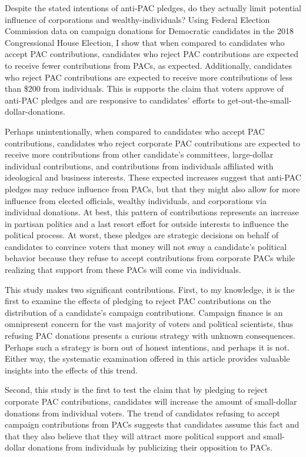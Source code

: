 \documentclass[12pt]{article}
\begin{document}
Despite the stated intentions of anti-PAC pledges, do they actually limit potential influence of corporations and wealthy-individuals? Using Federal Election Commission data on campaign donations for Democratic candidates in the 2018 Congressional House Election, I show that when compared to candidates who accept PAC contributions, candidates who reject PAC contributions are expected to receive fewer contributions from PACs, as expected. Additionally, candidates who reject PAC contributions are expected to receive more contributions of less than \$200 from individuals. This is supports the claim that voters approve of anti-PAC pledges and are responsive to candidates' efforts to get-out-the-small-dollar-donations.

Perhaps unintentionally, when compared to candidates who accept PAC contributions, candidates who reject corporate PAC contributions are expected to receive more contributions from other candidate's committees, large-dollar individual contributions, and contributions from individuals affiliated with ideological and business interests. These expected increases suggest that anti-PAC pledges may reduce influence from PACs, but that they might also allow for more influence from elected officials, wealthy individuals, and corporations via individual donations. At best, this pattern of contributions represents an increase in partisan politics and a last resort effort for outside interests to influence the political process. At worst, these pledges are strategic decisions on behalf of candidates to convince voters that money will not sway a candidate's political behavior because they refuse to accept contributions from corporate PACs while realizing that support from these PACs will come via individuals.     

This study makes two significant contributions. First, to my knowledge, it is the first to examine the effects of pledging to reject PAC contributions on the distribution of a candidate's campaign contributions. Campaign finance is an omnipresent concern for the vast majority of voters and political scientists, thus refusing PAC donations presents a curious strategy with unknown consequences. Perhaps such a strategy is born out of honest intentions, and perhaps it is not. Either way, the systematic examination offered in this article provides valuable insights into the effects of this trend. 

Second, this study is the first to test the claim that by pledging to reject corporate PAC contributions, candidates will increase the amount of small-dollar donations from individual voters. The trend of candidates refusing to accept campaign contributions from PACs suggests that candidates assume this fact and that they also believe that they will attract more political support and small-dollar donations from individuals by publicizing their opposition to PACs.  
\end{document}
